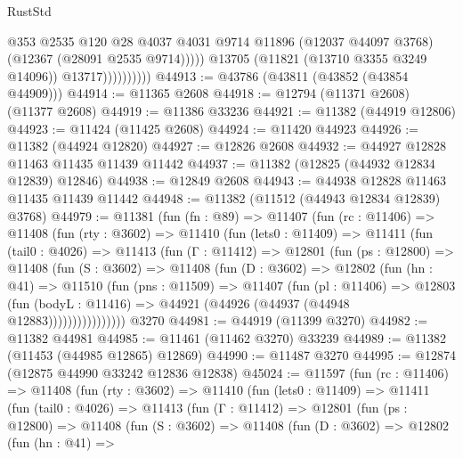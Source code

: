 \begin{lexlean}{RustStd}
\begin{coremodule}
                              @353
                              @2535
                              @120
                              @28
                              @4037
                              @4031
                              @9714
                              @11896
                              (@12037 @44097 @3768)
                              (@12367 (@28091 @2535 @9714)))))
                        @13705
                        (@11821 (@13710 @3355 @3249 @14096))
                        @13717))))))))))
@44913 := @43786 (@43811 (@43852 (@43854 @44909)))
@44914 := @11365 @2608
@44918 := @12794 (@11371 @2608) (@11377 @2608)
@44919 := @11386 @33236
@44921 := @11382 (@44919 @12806)
@44923 := @11424 (@11425 @2608)
@44924 := @11420 @44923
@44926 := @11382 (@44924 @12820)
@44927 := @12826 @2608
@44932 := @44927 @12828 @11463 @11435 @11439 @11442
@44937 := @11382 (@12825 (@44932 @12834 @12839) @12846)
@44938 := @12849 @2608
@44943 := @44938 @12828 @11463 @11435 @11439 @11442
@44948 := @11382 (@11512 (@44943 @12834 @12839) @3768)
@44979 := @11381
    (fun (fn : @89) =>
    @11407
      (fun (rc : @11406) =>
      @11408
        (fun (rty : @3602) =>
        @11410
          (fun (lets0 : @11409) =>
          @11411
            (fun (tail0 : @4026) =>
            @11413
              (fun (Γ : @11412) =>
              @12801
                (fun (ps : @12800) =>
                @11408
                  (fun (S : @3602) =>
                  @11408
                    (fun (D : @3602) =>
                    @12802
                      (fun (hn : @41) =>
                      @11510
                        (fun (pns : @11509) =>
                        @11407
                          (fun (pl : @11406) =>
                          @12803
                            (fun (bodyL : @11416) =>
                            @44921 (@44926 (@44937 (@44948 @12883))))))))))))))))
    @3270
@44981 := @44919 (@11399 @3270)
@44982 := @11382 @44981
@44985 := @11461 (@11462 @3270) @33239
@44989 := @11382 (@11453 (@44985 @12865) @12869)
@44990 := @11487 @3270
@44995 := @12874 (@12875 @44990 @33242 @12836 @12838)
@45024 := @11597
    (fun (rc : @11406) =>
    @11408
      (fun (rty : @3602) =>
      @11410
        (fun (lets0 : @11409) =>
        @11411
          (fun (tail0 : @4026) =>
          @11413
            (fun (Γ : @11412) =>
            @12801
              (fun (ps : @12800) =>
              @11408
                (fun (S : @3602) =>
                @11408
                  (fun (D : @3602) =>
                  @12802
                    (fun (hn : @41) =>

\end{coremodule}
\end{lexlean}
